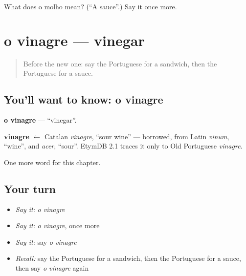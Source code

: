 \begin{tcolorbox}[breakable,colback=teal!4,colframe=teal!35!black,title={Before you move on}]
What does o molho mean? (\textquotedblleft{}A sauce\textquotedblright{}.) Say it once more.
\end{tcolorbox}
\section[o vinagre]{o vinagre — vinegar}

\label{lesson:PT-C107-vinagre}



\begin{quote}
Before the new one: say the Portuguese for a sandwich, then the Portuguese for a sauce.
\end{quote}

\subsection*{You'll want to know: o vinagre}
\textbf{o vinagre} — \textquotedblleft{}vinegar\textquotedblright{}.

\begin{cousinweb}
\textbf{vinagre} $\leftarrow$ Catalan \emph{vinagre}, \textquotedblleft{}sour wine\textquotedblright{} — borrowed, from Latin \emph{vinum}, \textquotedblleft{}wine\textquotedblright{}, and \emph{acer}, \textquotedblleft{}sour\textquotedblright{}. EtymDB 2.1 traces it only to Old Portuguese \emph{vinagre}.
\end{cousinweb}

\begin{grammarlens}[title={What you've built}]
One more word for this chapter.
\end{grammarlens}

\subsection*{Your turn}
\begin{itemize}
\raggedright
  \item \emph{Say it:} \emph{o vinagre}
  \item \emph{Say it:} \emph{o vinagre}, once more
  \item \emph{Say it:} say \emph{o vinagre}
  \item \emph{Recall:} say the Portuguese for a sandwich, then the Portuguese for a sauce, then say \emph{o vinagre} again
\end{itemize}


